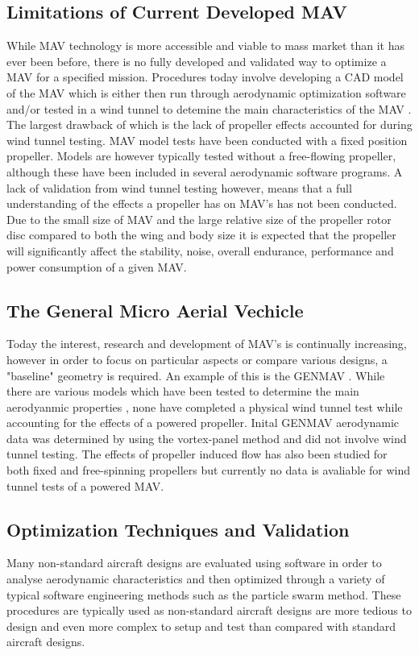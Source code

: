 
\subsection{Limitations of Current Developed MAV}
\label{subsec:Limitations}
While MAV technology is more accessible and viable to mass market than it has ever been before, there is no fully developed and validated way to optimize a MAV for a specified mission. Procedures today involve developing a CAD model of the MAV which is either then run through aerodynamic optimization software and/or tested in a wind tunnel to detemine the main characteristics of the MAV \cite{Paulson2017}. The largest drawback of which is the lack of propeller effects accounted for during wind tunnel testing. MAV model tests have been conducted with a fixed position propeller. Models are however typically tested without a free-flowing propeller, although these have been included in several aerodynamic software programs.  A lack of validation from wind tunnel testing however, means that a full understanding of the effects a propeller has on MAV's has not been conducted. Due to the small size of MAV and the large relative size of the propeller rotor disc compared to both the wing and body size it is expected that the propeller will significantly affect the stability, noise, overall endurance, performance and power consumption of a given MAV. 

\subsection{The General Micro Aerial Vechicle}
\label{subsec:GenMAV}
Today the interest, research and development of MAV's is continually increasing, however in order to focus on particular aspects or compare various designs, a "baseline" geometry is required. An example of this is the GENMAV \cite{Stewart2007}. While there are various models which have been tested to determine the main aerodyanmic properties \cite{Stewart2007}, none have completed a physical wind tunnel test while accounting for the effects of a powered propeller. Inital GENMAV aerodynamic data was determined by using the vortex-panel method \cite{Stewart2007} and did not involve wind tunnel testing. The effects of propeller induced flow has also been studied for both fixed and free-spinning propellers but currently no data is avaliable for wind tunnel tests of a powered MAV.

\subsection{Optimization Techniques and Validation}
\label{subsec:Optimization}
Many non-standard aircraft designs are evaluated using software in order to analyse aerodynamic characteristics and then optimized through a variety of typical software engineering methods such as the particle swarm method. These procedures are typically used as non-standard aircraft designs are more tedious to design and even more complex to setup and test than compared with standard aircraft designs. 

